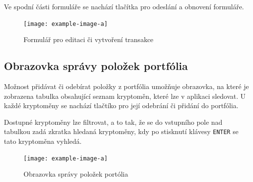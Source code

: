 \documentclass[12pt, a4paper]{article}
\begin{document}
    Ve spodní části formuláře se nachází tlačítka pro odeslání a obnovení formuláře.

    \begin{figure}[!ht]
        \centering
        {\texttt{[image: example-image-a]}}
        \caption{Formulář pro editaci či vytvoření transakce}
        \label{fig:transaction-form}
    \end{figure}

    \subsection{Obrazovka správy položek portfólia}
    Možnost přidávat či odebírat položky z portfólia umožňuje obrazovka, na které je zobrazena tabulka obsahující seznam
    kryptoměn, které lze v aplikaci sledovat.
    U každé kryptoměny se nachází tlačtíko pro její odebrání či přidání do portfólia.
    
    Dostupné kryptoměny lze filtrovat, a to tak, že se do vstupního pole nad tabulkou zadá zkratka hledaná kryptoměny, kdy po stisknutí klávesy \texttt{ENTER} se tato kryptoměna vyhledá.

    \begin{figure}[!ht]
        \centering
        {\texttt{[image: example-image-a]}}
        \caption{Obrazovka správy položek portólia}
        \label{fig:portfolio-entry-mngmnt}
    \end{figure}

    \printbibliography
\end{document}
